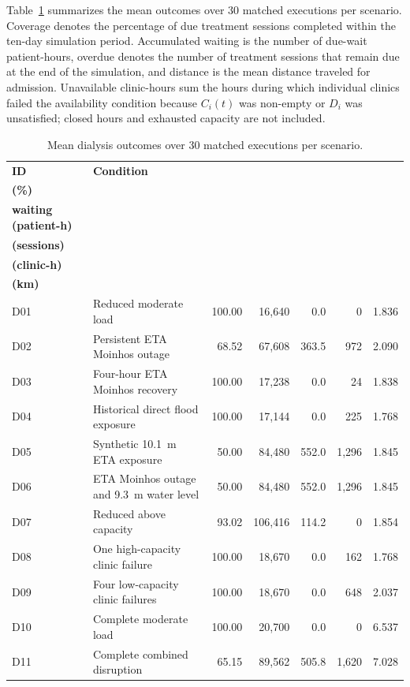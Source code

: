 Table~\ref{tbl:dialysis_results} summarizes the mean outcomes over 30 matched executions per scenario. Coverage denotes the percentage of due treatment sessions completed within the ten-day simulation period. Accumulated waiting is the number of due-wait patient-hours, overdue denotes the number of treatment sessions that remain due at the end of the simulation, and distance is the mean distance traveled for admission. Unavailable clinic-hours sum the hours during which individual clinics failed the availability condition because $C_i(t)$ was non-empty or $D_i$ was unsatisfied; closed hours and exhausted capacity are not included.

\begin{table}[ht]
\centering
\footnotesize
\setlength{\tabcolsep}{3pt}
\caption{Mean dialysis outcomes over 30 matched executions per scenario.}
\label{tbl:dialysis_results}
\begin{tabularx}{\linewidth}{
    @{}
    l
    >{\raggedright\arraybackslash}X
    rrrrr
    @{}
}
\toprule
\textbf{ID} &
\textbf{Condition} &
\shortstack{\textbf{Coverage}\\\textbf{(\%)}} &
\shortstack{\textbf{Accumulated}\\\textbf{waiting (patient-h)}} &
\shortstack{\textbf{Overdue}\\\textbf{(sessions)}} &
\shortstack{\textbf{Unavailable}\\\textbf{(clinic-h)}} &
\shortstack{\textbf{Mean distance}\\\textbf{(km)}} \\
\midrule
D01 & Reduced moderate load
    & 100.00 &  16,640 &   0.0 &     0 & 1.836 \\
D02 & Persistent ETA Moinhos outage
    &  68.52 &  67,608 & 363.5 &   972 & 2.090 \\
D03 & Four-hour ETA Moinhos recovery
    & 100.00 &  17,238 &   0.0 &    24 & 1.838 \\
D04 & Historical direct flood exposure
    & 100.00 &  17,144 &   0.0 &   225 & 1.768 \\
D05 & Synthetic 10.1~m ETA exposure
    &  50.00 &  84,480 & 552.0 & 1,296 & 1.845 \\
D06 & ETA Moinhos outage and 9.3~m water level
    &  50.00 &  84,480 & 552.0 & 1,296 & 1.845 \\
D07 & Reduced above capacity
    &  93.02 & 106,416 & 114.2 &     0 & 1.854 \\
D08 & One high-capacity clinic failure
    & 100.00 &  18,670 &   0.0 &   162 & 1.768 \\
D09 & Four low-capacity clinic failures
    & 100.00 &  18,670 &   0.0 &   648 & 2.037 \\
D10 & Complete moderate load
    & 100.00 &  20,700 &   0.0 &     0 & 6.537 \\
D11 & Complete combined disruption
    &  65.15 &  89,562 & 505.8 & 1,620 & 7.028 \\
\bottomrule
\end{tabularx}
\end{table}

